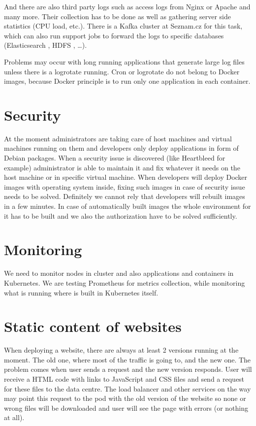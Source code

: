 And there are also third party logs such as access logs from Nginx \cite{nginx} or Apache \cite{apache} and many more. Their collection has to be done as well as gathering server side statistics (CPU load, etc.). There is a Kafka cluster at Seznam.cz for this task, which can also run support jobs to forward the logs to specific databases (Elasticsearch \cite{elasticsearch}, HDFS \cite{hdfs}, \ldots).

Problems may occur with long running applications that generate large log files unless there is a logrotate running. Cron or logrotate \cite{logrotate} do not belong to Docker images, because Docker principle is to run only one application in each container.

\section{Security}
At the moment administrators are taking care of host machines and virtual machines running on them and developers only deploy applications in form of Debian packages. When a  security issue is discovered (like Heartbleed \cite{heartbleed} for example) administrator is able to maintain it and fix whatever it needs on the host machine or in specific virtual machine. When developers will deploy Docker images with operating system inside, fixing such images in case of security issue needs to be solved. Definitely we cannot rely that developers will rebuilt images in a few minutes. In case of automatically built images the whole environment for it has to be built and we also the authorization have to be solved sufficiently.

\section{Monitoring}
We need to monitor nodes in cluster and also applications and containers in Kubernetes. We are testing Prometheus \cite{prometheus} for metrics collection, while monitoring what is running where is built in Kubernetes itself.

\section{Static content of websites}
When deploying a website, there are always at least 2 versions running at the moment. The old one, where most of the traffic is going to, and the new one. The problem comes when user sends a request and the new version responds. User will receive a HTML code with links to JavaScript and CSS files and send a request for these files to the data centre. The load balancer and other services on the way may point this request to the pod with the old version of the website so none or wrong files will be downloaded and user will see the page with errors (or nothing at all).

